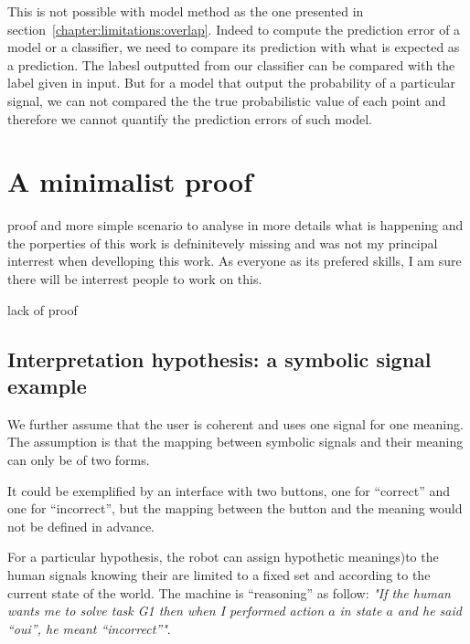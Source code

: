 This is not possible with model method as the one presented in section~\ref{chapter:limitations:overlap}. Indeed to compute the prediction error of a model or a classifier, we need to compare its prediction with what is expected as a prediction. The labesl outputted from our classifier can be compared with the label given in input. But for a model that output the probability of a particular signal, we can not compared the the true probabilistic value of each point and therefore we cannot quantify the prediction errors of such model.

\section{A minimalist proof}

proof and more simple scenario to analyse in more details what is happening and the porperties of this work is defninitevely missing and was not my principal interrest when develloping this work. As everyone as its prefered skills, I am sure there will be interrest people to work on this.

lack of proof

\subsection{Interpretation hypothesis: a symbolic signal example}

We further assume that the user is coherent and uses one signal for one meaning. The assumption is that the mapping between symbolic signals and their meaning can only be of two forms.

It could be exemplified by an interface with two buttons, one for ``correct'' and one for ``incorrect'', but the mapping between the button and the meaning would not be defined in advance.


For a particular hypothesis, the robot can assign hypothetic meanings)to the human signals knowing their are limited to a fixed set and according to the current state of the world. The machine is ``reasoning'' as follow: \emph{"If the human wants me to solve task G1 then when I performed action $a$ in state $a$ and he said ``oui'', he meant ``incorrect''"}. 

